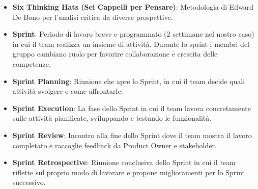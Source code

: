 \documentclass[11pt,a4paper]{article}
\begin{document}
\begin{itemize}
\item \textbf{Six Thinking Hats (Sei Cappelli per Pensare)}: Metodologia di Edward De Bono per l'analisi critica da diverse prospettive.
\item \textbf{Sprint}: Periodo di lavoro breve e programmato (2 settimane nel nostro caso) in cui il team realizza un insieme di attività. Durante lo sprint i membri del gruppo cambiano ruolo per favorire collaborazione e crescita delle competenze.
\item \textbf{Sprint Planning}: Riunione che apre lo Sprint, in cui il team decide quali attività svolgere e come affrontarle.
\item \textbf{Sprint Execution}: La fase dello Sprint in cui il team lavora concretamente sulle attività pianificate, sviluppando e testando le funzionalità.
\item \textbf{Sprint Review}: Incontro alla fine dello Sprint dove il team mostra il lavoro completato e raccoglie feedback da Product Owner e stakeholder.
\item \textbf{Sprint Retrospective}: Riunione conclusiva dello Sprint in cui il team riflette sul proprio modo di lavorare e propone miglioramenti per lo Sprint successivo.
\end{itemize}
\newpage
\end{document}
